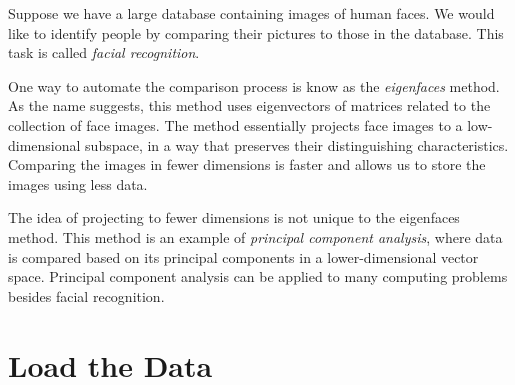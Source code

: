 \label{lab:FacialRecognition}


Suppose we have a large database containing images of human faces.
We would like to identify people by comparing their pictures to those in the database.
This task is called \emph{facial recognition}.

One way to automate the comparison process is know as the \emph{eigenfaces} method.
As the name suggests, this method uses eigenvectors of matrices related to the collection of face images.
The method essentially projects face images to a low-dimensional subspace, in a way that preserves their distinguishing characteristics.
Comparing the images in fewer dimensions is faster and allows us to store the images using less data.

The idea of projecting to fewer dimensions is not unique to the eigenfaces method.
This method is an example of \emph{principal component analysis}, where data is compared based on its principal components in a lower-dimensional vector space.
Principal component analysis can be applied to many computing problems besides facial recognition.

\section*{Load the Data}

